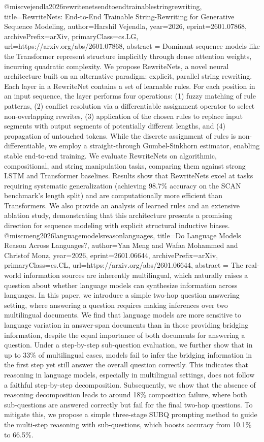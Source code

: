 {}@misc{vejendla2026rewritenetsendtoendtrainablestringrewriting,
      title={RewriteNets: End-to-End Trainable String-Rewriting for Generative Sequence Modeling}, 
      author={Harshil Vejendla},
      year={2026},
      eprint={2601.07868},
      archivePrefix={arXiv},
      primaryClass={cs.LG},
      url={https://arxiv.org/abs/2601.07868},
      abstract = {Dominant sequence models like the Transformer represent structure implicitly through dense attention weights, incurring quadratic complexity. We propose RewriteNets, a novel neural architecture built on an alternative paradigm: explicit, parallel string rewriting. Each layer in a RewriteNet contains a set of learnable rules. For each position in an input sequence, the layer performs four operations: (1) fuzzy matching of rule patterns, (2) conflict resolution via a differentiable assignment operator to select non-overlapping rewrites, (3) application of the chosen rules to replace input segments with output segments of potentially different lengths, and (4) propagation of untouched tokens. While the discrete assignment of rules is non-differentiable, we employ a straight-through Gumbel-Sinkhorn estimator, enabling stable end-to-end training. We evaluate RewriteNets on algorithmic, compositional, and string manipulation tasks, comparing them against strong LSTM and Transformer baselines. Results show that RewriteNets excel at tasks requiring systematic generalization (achieving 98.7\% accuracy on the SCAN benchmark's length split) and are computationally more efficient than Transformers. We also provide an analysis of learned rules and an extensive ablation study, demonstrating that this architecture presents a promising direction for sequence modeling with explicit structural inductive biases.}
}@misc{meng2026languagemodelsreasonlanguages,
      title={Do Language Models Reason Across Languages?}, 
      author={Yan Meng and Wafaa Mohammed and Christof Monz},
      year={2026},
      eprint={2601.06644},
      archivePrefix={arXiv},
      primaryClass={cs.CL},
      url={https://arxiv.org/abs/2601.06644},
      abstract = {The real-world information sources are inherently multilingual, which naturally raises a question about whether language models can synthesize information across languages. In this paper, we introduce a simple two-hop question answering setting, where answering a question requires making inferences over two multilingual documents. We find that language models are more sensitive to language variation in answer-span documents than in those providing bridging information, despite the equal importance of both documents for answering a question. Under a step-by-step sub-question evaluation, we further show that in up to 33\% of multilingual cases, models fail to infer the bridging information in the first step yet still answer the overall question correctly. This indicates that reasoning in language models, especially in multilingual settings, does not follow a faithful step-by-step decomposition. Subsequently, we show that the absence of reasoning decomposition leads to around 18\% composition failure, where both sub-questions are answered correctly but fail for the final two-hop questions. To mitigate this, we propose a simple three-stage SUBQ prompting method to guide the multi-step reasoning with sub-questions, which boosts accuracy from 10.1\% to 66.5\%.}
}
